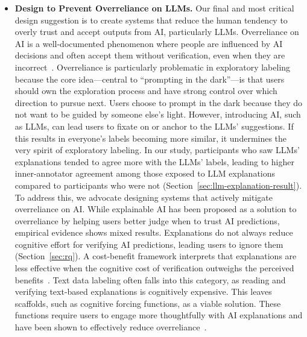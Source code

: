 \begin{itemize}
\item
\textbf{Design to Prevent Overreliance on LLMs.}
Our final and most critical design suggestion is to create systems that reduce the human tendency to overly trust and accept outputs from AI, particularly LLMs. 
Overreliance on AI is a well-documented phenomenon where people are influenced by AI decisions and often accept them without verification, even when they are incorrect~\cite{vasconcelos2023explanations}.
Overreliance is particularly problematic in exploratory labeling because the core idea---central to ``prompting in the dark''---is that users should own the exploration process and have strong control over which direction to pursue next. 
Users choose to prompt in the dark because they do not want to be guided by someone else's light.
However, introducing AI, such as LLMs, can lead users to fixate on or anchor to the LLMs' suggestions.
If this results in everyone's labels becoming more similar, it undermines the very spirit of exploratory labeling.
In our study, participants who saw LLMs' explanations tended to agree more with the LLMs' labels, leading to higher inner-annotator agreement among those exposed to LLM explanations compared to participants who were not (Section~\ref{sec:llm-explanation-result}). 
To address this, we advocate designing systems that actively mitigate overreliance on AI.
While explainable AI has been proposed as a solution to overreliance by helping users better judge when to trust AI predictions, empirical evidence shows mixed results. 
Explanations do not always reduce cognitive effort for verifying AI predictions, leading users to ignore them (Section~\ref{sec:rq}). %
A cost-benefit framework interprets that explanations are less effective when the cognitive cost of verification outweighs the perceived benefits~\cite{vasconcelos2023explanations}.
Text data labeling often falls into this category, as reading and verifying text-based explanations is cognitively expensive. 
This leaves scaffolds, such as cognitive forcing functions, as a viable solution. 
These functions require users to engage more thoughtfully with AI explanations and have been shown to effectively reduce overreliance~\cite{buccinca2021trust}.







\end{itemize}


